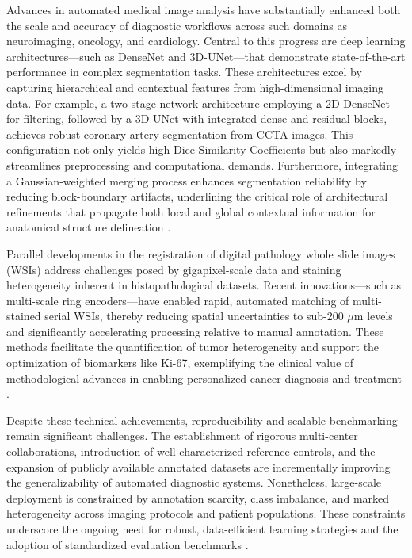 \documentclass[11pt]{article}
\begin{document}
Advances in automated medical image analysis have substantially enhanced both the scale and accuracy of diagnostic workflows across such domains as neuroimaging, oncology, and cardiology. Central to this progress are deep learning architectures—such as DenseNet and 3D-UNet—that demonstrate state-of-the-art performance in complex segmentation tasks. These architectures excel by capturing hierarchical and contextual features from high-dimensional imaging data. For example, a two-stage network architecture employing a 2D DenseNet for filtering, followed by a 3D-UNet with integrated dense and residual blocks, achieves robust coronary artery segmentation from CCTA images. This configuration not only yields high Dice Similarity Coefficients but also markedly streamlines preprocessing and computational demands. Furthermore, integrating a Gaussian-weighted merging process enhances segmentation reliability by reducing block-boundary artifacts, underlining the critical role of architectural refinements that propagate both local and global contextual information for anatomical structure delineation \cite{ref94}.

Parallel developments in the registration of digital pathology whole slide images (WSIs) address challenges posed by gigapixel-scale data and staining heterogeneity inherent in histopathological datasets. Recent innovations—such as multi-scale ring encoders—have enabled rapid, automated matching of multi-stained serial WSIs, thereby reducing spatial uncertainties to sub-200 $\mu$m levels and significantly accelerating processing relative to manual annotation. These methods facilitate the quantification of tumor heterogeneity and support the optimization of biomarkers like Ki-67, exemplifying the clinical value of methodological advances in enabling personalized cancer diagnosis and treatment \cite{ref100}.

Despite these technical achievements, reproducibility and scalable benchmarking remain significant challenges. The establishment of rigorous multi-center collaborations, introduction of well-characterized reference controls, and the expansion of publicly available annotated datasets are incrementally improving the generalizability of automated diagnostic systems. Nonetheless, large-scale deployment is constrained by annotation scarcity, class imbalance, and marked heterogeneity across imaging protocols and patient populations. These constraints underscore the ongoing need for robust, data-efficient learning strategies and the adoption of standardized evaluation benchmarks \cite{ref94}.
\end{document}
